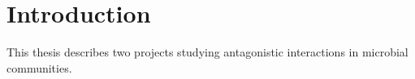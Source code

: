 \chapter*{Introduction}
This thesis describes two projects studying antagonistic interactions in microbial communities. 
